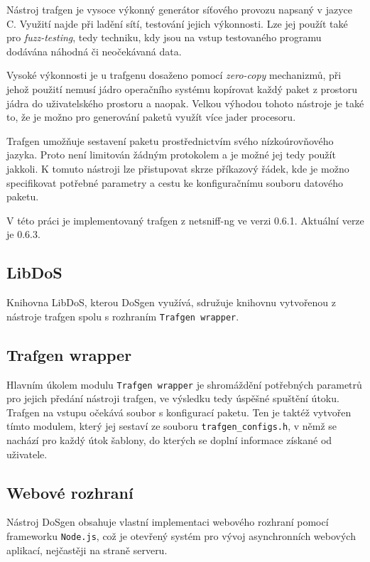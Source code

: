 Nástroj trafgen je vysoce výkonný generátor síťového provozu napsaný v jazyce C. Využití najde při ladění sítí, testování jejich výkonnosti. Lze jej použít také pro \textit{fuzz-testing}, tedy techniku, kdy jsou na vstup testovaného programu dodávána náhodná či neočekávaná data.

Vysoké výkonnosti je u trafgenu dosaženo pomocí \textit{zero-copy} mechanizmů, při jehož použití nemusí jádro operačního systému kopírovat každý paket z prostoru jádra do uživatelského prostoru a naopak. Velkou výhodou tohoto nástroje je také to, že je možno pro generování paketů využít více jader procesoru.

Trafgen umožňuje sestavení paketu prostřednictvím svého nízkoúrovňového jazyka. Proto není limitován žádným protokolem a je možné jej tedy použít jakkoli. K tomuto nástroji lze přistupovat skrze příkazový řádek, kde je možno specifikovat potřebné parametry a cestu ke konfiguračnímu souboru datového paketu.

V této práci je implementovaný trafgen z netsniff-ng ve verzi 0.6.1. Aktuální verze je 0.6.3.

\subsection{LibDoS}
Knihovna LibDoS, kterou DoSgen využívá, sdružuje knihovnu vytvořenou z nástroje trafgen spolu s rozhraním \texttt{Trafgen wrapper}.

\subsection{Trafgen wrapper}
Hlavním úkolem modulu \texttt{Trafgen wrapper} je shromáždění potřebných parametrů pro jejich předání nástroji trafgen, ve výsledku tedy úspěšné spuštění útoku. Trafgen na vstupu očekává soubor s konfigurací paketu. Ten je taktéž vytvořen tímto modulem, který jej sestaví ze souboru \texttt{trafgen\_configs.h}, v němž se nachází pro každý útok šablony, do kterých se doplní informace získané od uživatele.

\subsection{Webové rozhraní}
Nástroj DoSgen obsahuje vlastní implementaci webového rozhraní pomocí frameworku \texttt{Node.js}, což je otevřený systém pro vývoj asynchronních webových aplikací, nejčastěji na straně serveru.

